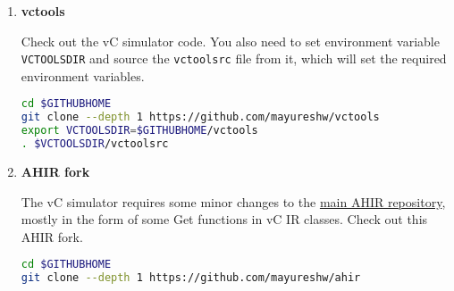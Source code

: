 \documentclass[12pt,a4paper]{article}
\begin{document}
\begin{enumerate}
Preferably choose a system-wide installation directory for XSB and carry out the installation as root. But if you prefer so, you can build XSB in your login as well.

\begin{lstlisting}[language=bash,style=snippet]
# Go to the directory you have chosen for XSB installation
# Use root login if it is a system directory like /usr/local
cd /usr/local
# Note that the URL is a continuous string without newline
wget --content-disposition https://sourceforge.net/projects/xsb/files/xsb/5.0%20%28Green%20Tea%29/XSB-5.0.tar.gz/download
tar xvfz XSB-5.0.tar.gz
cd XSB/build
./configure
./makexsb fast package
\end{lstlisting}

Make the following environment setting to let our build process know the location where you have installed XSB Prolog.

\begin{lstlisting}[language=bash,style=snippet]
# Use your installation path if different
export XSBDIR=/usr/local/XSB
\end{lstlisting}

To cross check: Run the following command. It should launch the XSB Prolog interpreter. You may exit it by hitting Ctrl-D.

\begin{lstlisting}[language=bash,style=snippet]
$XSBDIR/bin/xsb
\end{lstlisting}

\item \textbf{vctools}

Check out the vC simulator code. You also need to set environment variable \texttt{VCTOOLSDIR} and source the \texttt{vctoolsrc} file from it, which will set the required environment variables.

\begin{lstlisting}[language=bash,style=snippet]
cd $GITHUBHOME
git clone --depth 1 https://github.com/mayureshw/vctools
export VCTOOLSDIR=$GITHUBHOME/vctools
. $VCTOOLSDIR/vctoolsrc
\end{lstlisting}

\item \textbf{AHIR fork}

The vC simulator requires some minor changes to the \href{https://github.com/madhavPdesai/ahir}{main AHIR repository}, mostly in the form of some Get functions in vC IR classes. Check out this AHIR fork.

\begin{lstlisting}[language=bash,style=snippet]
cd $GITHUBHOME
git clone --depth 1 https://github.com/mayureshw/ahir
\end{lstlisting}


\end{enumerate}
\end{document}
